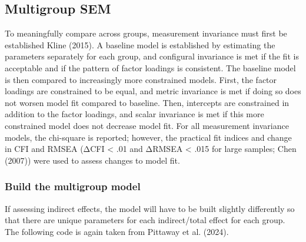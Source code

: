 \documentclass[
  letterpaper,
  DIV=11,
  numbers=noendperiod]{scrreprt}
\begin{document}
\subsection{Multigroup SEM}\label{multigroup-sem}

To meaningfully compare across groups, measurement invariance must first
be established Kline (2015). A baseline model is established by
estimating the parameters separately for each group, and configural
invariance is met if the fit is acceptable and if the pattern of factor
loadings is consistent. The baseline model is then compared to
increasingly more constrained models. First, the factor loadings are
constrained to be equal, and metric invariance is met if doing so does
not worsen model fit compared to baseline. Then, intercepts are
constrained in addition to the factor loadings, and scalar invariance is
met if this more constrained model does not decrease model fit. For all
measurement invariance models, the chi-square is reported; however, the
practical fit indices and change in CFI and RMSEA (ΔCFI \textless{} .01
and ΔRMSEA \textless{} .015 for large samples; Chen (2007)) were used to
assess changes to model fit.

\subsubsection{Build the multigroup
model}\label{build-the-multigroup-model}

If assessing indirect effects, the model will have to be built slightly
differently so that there are unique parameters for each indirect/total
effect for each group. The following code is again taken from Pittaway
et al. (2024).
\end{document}
